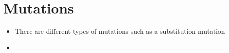 \documentclass[letterpaper]{article}
\begin{document}
\section{Mutations}
\label{sec:orgc91a9e3}
\begin{itemize}
\item There are different types of mutations such as a substitution mutation
\item 
\end{itemize}
\end{document}
